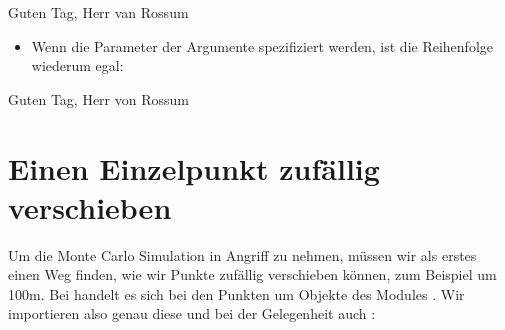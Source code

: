 \documentclass[letterpaper,10pt,english]{sphinxmanual}
\begin{document}
\begin{sphinxVerbatim}[commandchars=\\\{\}]
 
\end{sphinxVerbatim}

\begin{sphinxVerbatim}[commandchars=\\\{\}]
\PYGZsq{}Guten Tag, Herr van Rossum\PYGZsq{}
\end{sphinxVerbatim}
\begin{itemize}
\item {} 
Wenn die Parameter der Argumente spezifiziert werden, ist die Reihenfolge wiederum egal:

\end{itemize}

\begin{sphinxVerbatim}[commandchars=\\\{\}]
     
\end{sphinxVerbatim}

\begin{sphinxVerbatim}[commandchars=\\\{\}]
\PYGZsq{}Guten Tag, Herr von Rossum\PYGZsq{}
\end{sphinxVerbatim}


\chapter{Einen Einzelpunkt zufällig verschieben}
\label{\detokenize{02_04_Einzelpunkt_Verschieben:einen-einzelpunkt-zufallig-verschieben}}\label{\detokenize{02_04_Einzelpunkt_Verschieben::doc}}
Um die Monte Carlo Simulation in Angriff zu nehmen, müssen wir als erstes einen Weg finden, wie wir Punkte zufällig verschieben können, zum Beispiel um 100m. Bei  handelt es sich bei den Punkten um \sphinxhyphen{}Objekte des Modules . Wir importieren also genau diese  und bei der Gelegenheit auch :

\begin{sphinxVerbatim}[commandchars=\\\{\}]
   
   
\end{sphinxVerbatim}
\end{document}
